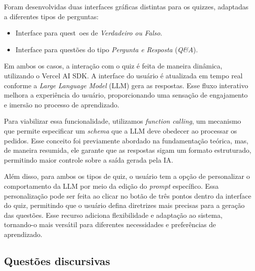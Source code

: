 \documentclass[tcc,capa]{texufpel}
\begin{document}
Foram desenvolvidas duas interfaces gr\'aficas distintas para os quizzes, adaptadas a diferentes tipos de perguntas:

\begin{itemize}
  \item Interface para quest~oes de \textit{Verdadeiro ou Falso}.
  \item Interface para quest\~oes do tipo \textit{Pergunta e Resposta} (\textit{Q\&A}).

  \end{itemize}

Em ambos os casos, a intera\c{c}\~ao com o quiz \'e feita de maneira din\^amica, utilizando o Vercel AI SDK. A interface do usu\'ario \'e atualizada em tempo real conforme a \textit{Large Language Model} (LLM) gera as respostas. Esse fluxo interativo melhora a experi\^encia do usu\'ario, proporcionando uma sensa\c{c}\~ao de engajamento e imers\~ao no processo de aprendizado.

Para viabilizar essa funcionalidade, utilizamos \textit{function calling}, um mecanismo que permite especificar um \textit{schema} que a LLM deve obedecer ao processar os pedidos. Esse conceito foi previamente abordado na fundamenta\c{c}\~{a}o te\'orica, mas, de maneira resumida, ele garante que as respostas sigam um formato estruturado, permitindo maior controle sobre a sa\'ida gerada pela IA.

Al\'em disso, para ambos os tipos de quiz, o usu\'ario tem a op\c{c}\~ao de personalizar o comportamento da LLM por meio da edi\c{c}\~ao do \textit{prompt} espec\'ifico. Essa personaliza\c{c}\~ao pode ser feita ao clicar no bot\~ao de tr\^es pontos dentro da interface do quiz, permitindo que o usu\'ario defina diretrizes mais precisas para a gera\c{c}\~ao das quest\~oes. Esse recurso adiciona flexibilidade e adapta\c{c}\~ao ao sistema, tornando-o mais vers\'atil para diferentes necessidades e prefer\^encias de aprendizado.

\subsection{Questões discursivas}
\end{document}
